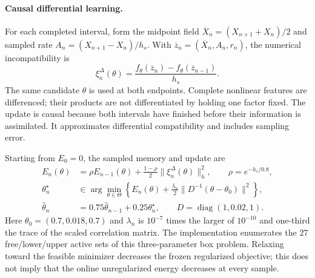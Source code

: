 \documentclass[10pt]{article}
\begin{document}
\paragraph{Causal differential learning.}
For each completed interval, form the midpoint field
$\overline X_n=(X_{n+1}+X_n)/2$ and sampled rate
$A_n=(X_{n+1}-X_n)/h_s$. With $\overline z_n=(\overline X_n,A_n,r_n)$,
the numerical incompatibility is
\begin{equation}
 \xi_n^\Delta(\theta)=
 \frac{f_\theta(\overline z_n)-f_\theta(\overline z_{n-1})}{h_s}.
 \label{eq:afc_secant}
\end{equation}
The same candidate $\theta$ is used at both endpoints. Complete nonlinear
features are differenced; their products are not differentiated by holding
one factor fixed. The update is causal because both intervals have finished
before their information is assimilated. It approximates differential
compatibility and includes sampling error.

Starting from $E_0=0$, the sampled memory and update are
\begin{align}
 E_n(\theta)&=\rho E_{n-1}(\theta)
  +\frac{1-\rho}{2}\|\xi_n^\Delta(\theta)\|_h^2,
  \qquad \rho=e^{-h_s/0.8},\\
 \theta_n^\star&\in\arg\min_{\theta\in\Theta}
 \left\{E_n(\theta)+\frac{\lambda_n}{2}
       \|D^{-1}(\theta-\theta_0)\|^2\right\},\\
 \widehat\theta_n&=0.75\widehat\theta_{n-1}+0.25\theta_n^\star,
 \qquad D=\operatorname{diag}(1,0.02,1).
\end{align}
Here $\theta_0=(0.7,0.018,0.7)$ and $\lambda_n$ is $10^{-7}$ times
the larger of $10^{-10}$ and one-third the trace of the scaled
correlation matrix. The implementation enumerates the 27 free/lower/upper
active sets of this three-parameter box problem. Relaxing toward the
feasible minimizer decreases the frozen regularized objective; this does
not imply that the online unregularized energy decreases at every sample.
\end{document}

